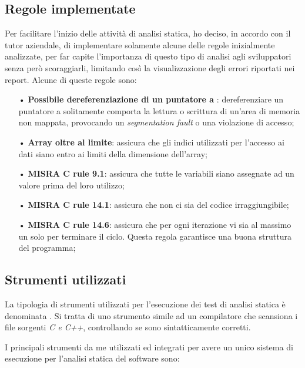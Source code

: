 \subsection{Regole implementate}
Per facilitare l'inizio delle attività di analisi statica, ho deciso, in accordo con il tutor aziendale, di implementare solamente alcune delle regole inizialmente analizzate, per far capite l'importanza di questo tipo di analisi agli sviluppatori senza però scoraggiarli, limitando così la visualizzazione degli errori riportati nei report.
Alcune di queste regole sono:
\begin{itemize}
\item[•] \textbf{Possibile dereferenziazione di un puntatore a }: dereferenziare un puntatore a  solitamente comporta la lettura o scrittura di un'area di memoria non mappata, provocando un \textit{segmentation fault} o una violazione di accesso;

\item[•] \textbf{Array oltre al limite}: assicura che gli indici utilizzati per l'accesso ai dati siano entro ai limiti della dimensione dell'array;

\item[•] \textbf{MISRA C rule 9.1}: assicura che tutte le variabili siano assegnate ad un valore prima del loro utilizzo;

\item[•] \textbf{MISRA C rule 14.1}: assicura che non ci sia del codice irraggiungibile;

\item[•] \textbf{MISRA C rule 14.6}: assicura che per ogni iterazione vi sia al massimo un solo  per terminare il ciclo. Questa regola garantisce una buona struttura del programma;


\end{itemize}

\subsection{Strumenti utilizzati}
La tipologia di strumenti utilizzati per l'esecuzione dei test di analisi statica è denominata . Si tratta di uno strumento simile ad un compilatore che scansiona i file sorgenti \textit{C e C++}, controllando se sono sintatticamente corretti.

I principali strumenti da me utilizzati ed integrati per avere un unico sistema di esecuzione per l'analisi statica del software sono:

